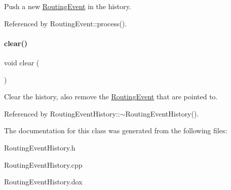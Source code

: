 Push a new \hyperlink{classKite_1_1RoutingEvent}{Routing\+Event} in the history. 

Referenced by Routing\+Event\+::process().

\mbox{\label{classKite_1_1RoutingEventHistory_ac8bb3912a3ce86b15842e79d0b421204}} 
\paragraph{\texorpdfstring{clear()}{clear()}}
{\footnotesize\ttfamily void clear (\begin{DoxyParamCaption}{ }\end{DoxyParamCaption})}

Clear the history, also remove the \hyperlink{classKite_1_1RoutingEvent}{Routing\+Event} that are pointed to. 

Referenced by Routing\+Event\+History\+::$\sim$\+Routing\+Event\+History().



The documentation for this class was generated from the following files\+:\begin{DoxyCompactItemize}
\item 
Routing\+Event\+History.\+h\item 
Routing\+Event\+History.\+cpp\item 
Routing\+Event\+History.\+dox\end{DoxyCompactItemize}
